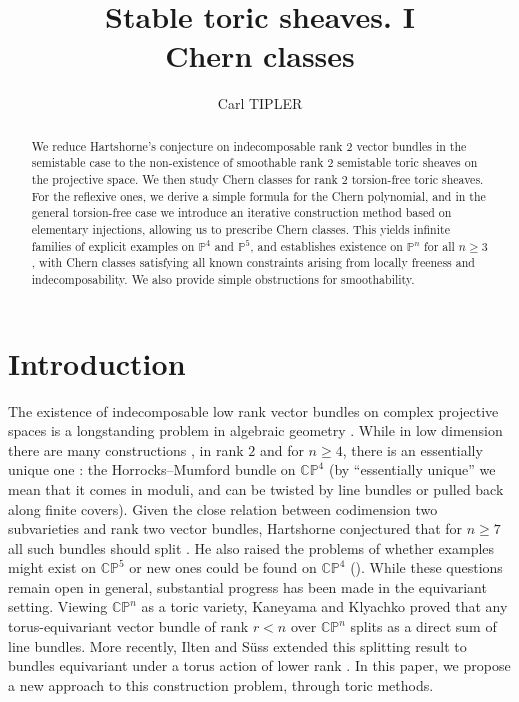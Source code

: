 \documentclass[a4paper,10pt]{amsart}
\theoremstyle{plain}{
    \newtheorem{theorem}{Theorem}[section]
    \newtheorem{lemma}[theorem]{Lemma}
    \newtheorem{corollary}[theorem]{Corollary}
    \newtheorem{proposition}[theorem]{Proposition}
    \newtheorem{conjecture}[theorem]{Conjecture}
}
\theoremstyle{definition}{
    \newtheorem{definition}[theorem]{Definition}
    \newtheorem{defn-thm}[theorem]{Definition-Theorem}
    \newtheorem{example}[theorem]{Example}
    \newtheorem{notation}[theorem]{Notation}
}
\theoremstyle{remark}{
    \newtheorem{remark}[theorem]{Remark}
    \newtheorem{problem}[theorem]{Problem}
    \newtheorem{question}[theorem]{Question}
}
\def\P{\mathbb{P}}
\def\C{\mathbb{C}}
\begin{document}
\title[Stable Toric sheaves. I]{Stable toric sheaves. I \\
Chern classes}


\address{Univ Brest, UMR CNRS 6205, Laboratoire de Mathématiques de Bretagne
Atlantique, France}


\author[C. Tipler]{Carl TIPLER}


\begin{abstract}
We reduce Hartshorne's conjecture on indecomposable rank $2$ vector bundles in the semistable case to the non-existence of smoothable rank $2$ semistable toric sheaves on the projective space. We then study Chern classes for rank $2$ torsion-free toric sheaves. For the reflexive ones, we derive a simple formula for the Chern polynomial, and in the general torsion-free case we introduce an iterative construction method based on elementary injections, allowing us to prescribe Chern classes. This yields infinite families of explicit examples on $\mathbb{P}^4$ and $\mathbb{P}^5$, and establishes existence on $\mathbb{P}^n$ for all $n \geq 3$, with Chern classes satisfying all known constraints arising from locally freeness and indecomposability. We also provide simple obstructions for smoothability.
\end{abstract}

\maketitle

\section{Introduction}

The existence of indecomposable low rank vector bundles on complex projective spaces is a longstanding problem in algebraic geometry \cite{Har79,OSS}. While in low dimension there are many constructions \cite{OSS}, in rank $2$ and for $n\geq 4$, there is an essentially unique one : the Horrocks--Mumford bundle on 
 $\C\P^4$ \cite{HoMu} (by ``essentially unique'' we mean that it comes in moduli, and can be twisted by line bundles or pulled back along finite covers). Given the close relation between  codimension two subvarieties and rank two vector bundles,  Hartshorne conjectured that for $n\geq 7$ all such bundles should split \cite[Conjecture 6.3]{Har74}. He also raised the problems of whether examples might exist on $\C\P^5$  or new ones could be found on $\C\P^4$ (\cite[Problems 1 and 2]{Har79}). While these questions remain open in general, substantial progress has been made in the equivariant setting. Viewing $\C\P^n$ as a toric variety, Kaneyama \cite{Kan} and Klyachko \cite{Kly90} proved that any torus-equivariant vector bundle of rank $r<n$ over $\C\P^n$ splits as a direct sum of line bundles. More recently, Ilten and S\"uss extended this splitting result to bundles equivariant under a torus action of lower rank \cite{IlSu}. In this paper, we propose a new approach to this construction problem, through toric methods.
\end{document}
